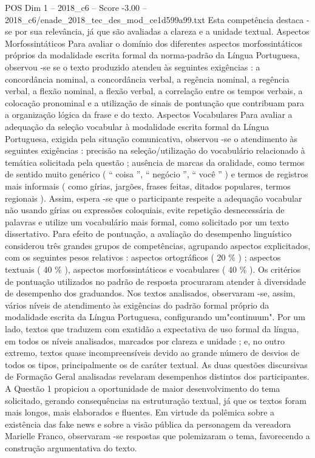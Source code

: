 \begin{textsample}{POS Dim 1 – 2018\_c6 – Score -3.00 – 2018\_c6/enade\_2018\_tec\_des\_mod\_ce1d599a99.txt}
Esta competência destaca -se por sua relevância, já que são avaliadas a clareza e a unidade textual.
Aspectos Morfossintáticos Para avaliar o domínio dos diferentes aspectos morfossintáticos próprios da modalidade escrita formal da norma-padrão da Língua Portuguesa, observou -se se o texto produzido atendeu às seguintes exigências : a concordância nominal, a concordância verbal, a regência nominal, a regência verbal, a flexão nominal, a flexão verbal, a correlação entre os tempos verbais, a colocação pronominal e a utilização de sinais de pontuação que contribuam para a organização lógica da frase e do texto.
Aspectos Vocabulares Para avaliar a adequação da seleção vocabular à modalidade escrita formal da Língua Portuguesa, exigida pela situação comunicativa, observou -se o atendimento às seguintes exigências : precisão na seleção/utilização do vocabulário relacionado à temática solicitada pela questão ; ausência de marcas da oralidade, como termos de sentido muito genérico ( “ coisa ”, “ negócio ”, “ você ” ) e termos de registros mais informais ( como gírias, jargões, frases feitas, ditados populares, termos regionais ).
Assim, espera -se que o participante respeite a adequação vocabular não usando gírias ou expressões coloquiais, evite repetição desnecessária de palavras e utilize um vocabulário mais formal, como solicitado por um texto dissertativo.
Para efeito de pontuação, a avaliação do desempenho linguístico considerou três grandes grupos de competências, agrupando aspectos explicitados, com os seguintes pesos relativos : aspectos ortográficos ( 20 \% ) ; aspectos textuais ( 40 \% ), aspectos morfossintáticos e vocabulares ( 40 \% ).
Os critérios de pontuação utilizados no padrão de resposta procuraram atender à diversidade de desempenho dos graduandos.
Nos textos analisados, observaram -se, assim, vários níveis de atendimento às exigências do padrão formal próprio da modalidade escrita da Língua Portuguesa, configurando um"continuum".
Por um lado, textos que traduzem com exatidão a expectativa de uso formal da língua, em todos os níveis analisados, marcados por clareza e unidade ; e, no outro extremo, textos quase incompreensíveis devido ao grande número de desvios de todos os tipos, principalmente os de caráter textual.
As duas questões discursivas de Formação Geral analisadas revelaram desempenhos distintos dos participantes.
A Questão 1 propiciou a oportunidade de maior desenvolvimento do tema solicitado, gerando consequências na estruturação textual, já que os textos foram mais longos, mais elaborados e fluentes.
Em virtude da polêmica sobre a existência das fake news e sobre a visão pública da personagem da vereadora Marielle Franco, observaram -se respostas que polemizaram o tema, favorecendo a construção argumentativa do texto.

\end{textsample}
